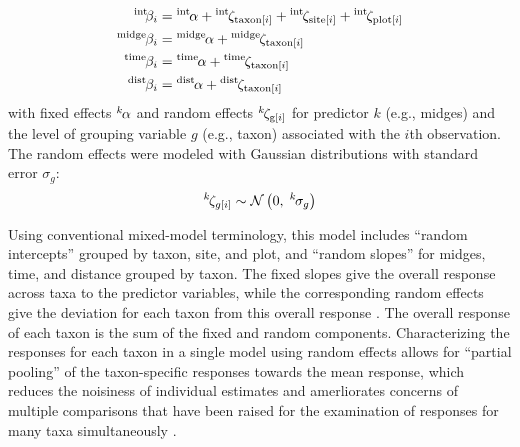 \begin{equation} \label{eq:betas}
\begin{split}
    {}^\text{int}\hspace*{-2pt}\beta_i &= {}^\text{int}\hspace*{-1pt}\alpha +
        {}^\text{int}\hspace*{-1pt}\zeta_{\text{taxon}[i]} +
        {}^\text{int}\hspace*{-1pt}\zeta_{\text{site}[i]} +
        {}^\text{int}\hspace*{-1pt}\zeta_{\text{plot}[i]} \\
    {}^\text{midge}\hspace*{-1pt}\beta_i &= {}^\text{midge}\hspace*{-1pt}\alpha +
            {}^\text{midge}\hspace*{-1pt}\zeta_{\text{taxon}[i]} \\
    {}^\text{time}\hspace*{-1pt}\beta_i &= {}^\text{time}\hspace*{-1pt}\alpha +
            {}^\text{time}\hspace*{-1pt}\zeta_{\text{taxon}[i]} \\
    {}^\text{dist}\hspace*{-1pt}\beta_i &= {}^\text{dist}\hspace*{-1pt}\alpha +
            {}^\text{dist}\hspace*{-1pt}\zeta_{\text{taxon}[i]}
\end{split}
\end{equation}
%
\noindent with fixed effects ${}^k\hspace*{-1pt}\alpha$ and random effects
${}^k\hspace*{-1pt}\zeta_{\text{g}[i]}$ for predictor $k$ (e.g., midges)
and the level of grouping variable $g$ (e.g., taxon) associated  with the $i$th observation.
The random effects were modeled with Gaussian distributions with
standard error $\sigma_g$:
%
\begin{equation} \label{eq:zetas}
    {}^k\hspace*{-1pt}\zeta_{g[i]} \sim
        \mathcal{N}\left(0, \; {}^k\hspace*{-1pt}\sigma_g \right)
\end{equation}

Using conventional mixed-model terminology, this model includes ``random intercepts''
grouped by taxon, site, and plot, and ``random slopes'' for midges,
time, and distance grouped by taxon.
The fixed slopes give the overall response across taxa to the predictor variables,
while the corresponding random effects give the deviation for each taxon from
this overall response \citep{Jackson2012}.
The overall response of each taxon is the sum of the fixed and random components.
Characterizing the responses for each taxon in a single model using random effects
allows for ``partial pooling'' of the taxon-specific responses towards the mean response,
which reduces the noisiness of individual estimates and amerliorates concerns of
multiple comparisons \citep{Gelman2012} that have been raised
for the examination of responses for many taxa simultaneously \citep{Mcgarigal2013}.

